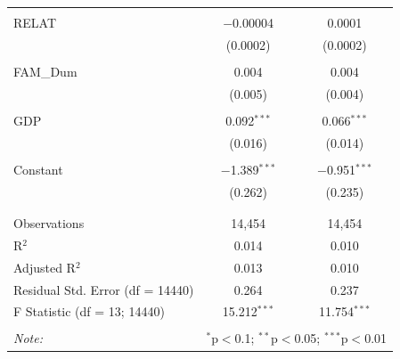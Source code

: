 \documentclass[a4paper]{article}\usepackage[]{graphicx}\usepackage[]{color}
\begin{document}
\begin{table}[!htbp]
\begin{tabular}{@{\extracolsep{5pt}}lcc}
  & & \\ 
 RELAT & $-$0.00004 & 0.0001 \\ 
  & (0.0002) & (0.0002) \\ 
  & & \\ 
 FAM\_Dum & 0.004 & 0.004 \\ 
  & (0.005) & (0.004) \\ 
  & & \\ 
 GDP & 0.092$^{***}$ & 0.066$^{***}$ \\ 
  & (0.016) & (0.014) \\ 
  & & \\ 
 Constant & $-$1.389$^{***}$ & $-$0.951$^{***}$ \\ 
  & (0.262) & (0.235) \\ 
  & & \\ 
\hline \\[-1.8ex] 
Observations & 14,454 & 14,454 \\ 
R$^{2}$ & 0.014 & 0.010 \\ 
Adjusted R$^{2}$ & 0.013 & 0.010 \\ 
Residual Std. Error (df = 14440) & 0.264 & 0.237 \\ 
F Statistic (df = 13; 14440) & 15.212$^{***}$ & 11.754$^{***}$ \\ 
\hline 
\hline \\[-1.8ex] 
\textit{Note:}  & \multicolumn{2}{r}{$^{*}$p$<$0.1; $^{**}$p$<$0.05; $^{***}$p$<$0.01} \\ 
\end{tabular} 
\end{table} 


\newpage
\end{document}
